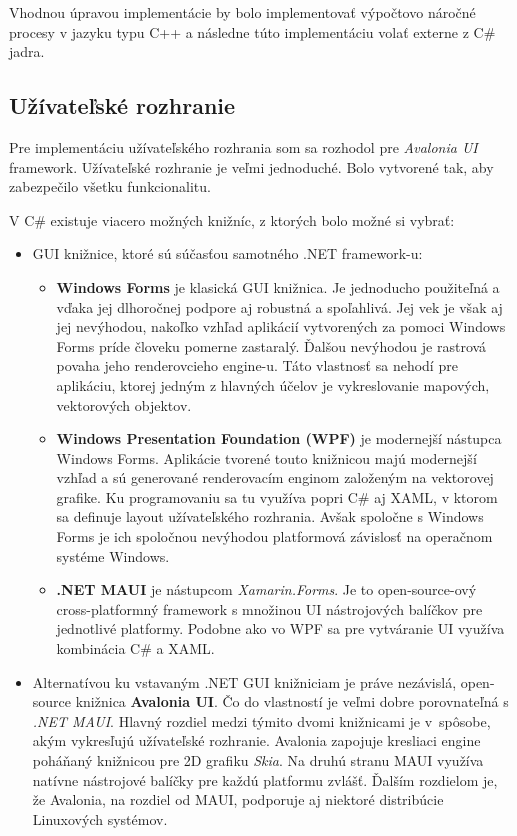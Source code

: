 Vhodnou úpravou implementácie by bolo implementovať výpočtovo náročné procesy v jazyku typu C++ a následne túto implementáciu volať externe z C\# jadra.     

\subsection{Užívateľské rozhranie}

Pre implementáciu užívateľského rozhrania som sa rozhodol pre \textit{Avalonia UI} framework. Užívateľské rozhranie je veľmi jednoduché. Bolo vytvorené tak, aby zabezpečilo všetku funkcionalitu.

V C\# existuje viacero možných knižníc, z ktorých bolo možné si vybrať:
\begin{itemize}
    \item GUI knižnice, ktoré sú súčasťou samotného .NET framework-u:
    \begin{itemize}
        \item \textbf{Windows Forms} je klasická GUI knižnica. Je jednoducho použiteľná a vďaka jej dlhoročnej podpore aj robustná a spoľahlivá. Jej vek je však aj jej nevýhodou, nakoľko vzhľad aplikácií vytvorených za pomoci Windows Forms príde človeku pomerne zastaralý. Ďalšou nevýhodou je rastrová povaha jeho renderovcieho engine-u. Táto vlastnosť sa nehodí pre aplikáciu, ktorej jedným z hlavných účelov je vykreslovanie mapových, vektorových objektov.     
        \item \textbf{Windows Presentation Foundation (WPF)} je modernejší nástupca Windows Forms. Aplikácie tvorené touto knižnicou majú modernejší vzhľad a sú generované renderovacím enginom založeným na vektorovej grafike. Ku programovaniu sa tu využíva popri C\# aj XAML, v ktorom sa definuje layout užívateľského rozhrania. Avšak spoločne s Windows Forms je ich spoločnou nevýhodou platformová závislosť na operačnom systéme Windows.
        \item \textbf{.NET MAUI} je nástupcom \textit{Xamarin.Forms}. Je to open-source-ový cross-platformný framework s množinou UI nástrojových balíčkov pre jednotlivé platformy. Podobne ako vo WPF sa pre vytváranie UI využíva kombinácia C\# a XAML. 
    \end{itemize}
    \item Alternatívou ku vstavaným .NET GUI knižniciam je práve nezávislá, open-source knižnica \textbf{Avalonia UI}. Čo do vlastností je veľmi dobre porovnateľná s \textit{.NET MAUI}. Hlavný rozdiel medzi týmito dvomi knižnicami je v~spôsobe, akým vykresľujú užívateľské rozhranie. Avalonia zapojuje kresliaci engine poháňaný knižnicou pre 2D grafiku \textit{Skia}. Na druhú stranu MAUI využíva natívne nástrojové balíčky pre každú platformu zvlášť. Ďalším rozdielom je, že Avalonia, na rozdiel od MAUI, podporuje aj niektoré distribúcie Linuxových systémov.
\end{itemize}

